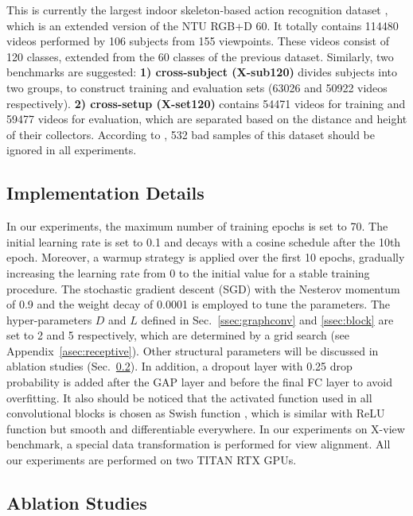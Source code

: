 \documentclass[10pt,journal,compsoc]{IEEEtran}
\begin{document}
This is currently the largest indoor skeleton-based action recognition dataset \cite{liu2019ntu}, which is an extended version of the NTU RGB+D 60. It totally contains 114480 videos performed by 106 subjects from 155 viewpoints. These videos consist of 120 classes, extended from the 60 classes of the previous dataset. Similarly, two benchmarks are suggested: {\bf 1) cross-subject (X-sub120)} divides subjects into two groups, to construct training and evaluation sets (63026 and 50922 videos respectively). {\bf 2) cross-setup (X-set120)} contains 54471 videos for training and 59477 videos for evaluation, which are separated based on the distance and height of their collectors. According to \cite{liu2019ntu}, 532 bad samples of this dataset should be ignored in all experiments.

\subsection{Implementation Details}
\label{ssec:implementation}

In our experiments, the maximum number of training epochs is set to 70. The initial learning rate is set to 0.1 and decays with a cosine schedule after the 10th epoch. Moreover, a warmup strategy \cite{he2016deep} is applied over the first 10 epochs, gradually increasing the learning rate from 0 to the initial value for a stable training procedure. The stochastic gradient descent (SGD) with the Nesterov momentum of 0.9 and the weight decay of 0.0001 is employed to tune the parameters. The hyper-parameters $D$ and $L$ defined in Sec.~\ref{ssec:graphconv} and \ref{ssec:block} are set to 2 and 5 respectively, which are determined by a grid search (see Appendix~\ref{asec:receptive}). Other structural parameters will be discussed in ablation studies (Sec.~\ref{ssec:ablation}). In addition, a dropout layer with 0.25 drop probability is added after the GAP layer and before the final FC layer to avoid overfitting. It also should be noticed that the activated function used in all convolutional blocks is chosen as Swish function \cite{ramachandran2017searching}, which is similar with ReLU function but smooth and differentiable everywhere. In our experiments on X-view benchmark, a special data transformation \cite{shi2019two} is performed for view alignment. All our experiments are performed on two TITAN RTX GPUs.

\subsection{Ablation Studies}
\label{ssec:ablation}
\end{document}

